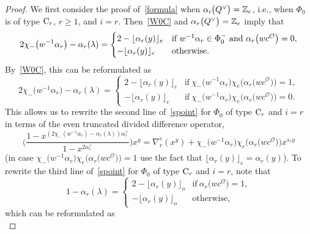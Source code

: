 \documentclass[pdftex]{sigma}
\numberwithin{equation}{section}
\begin{document}
\begin{proof}
We first consider the proof of~\eqref{formula} when $\alpha_i\smash{\bigl(Q^\vee\bigr)}=\mathbb{Z}_e$, i.e., when $\Phi_0$ is of type ${\rm C}_r$, $r\geq 1$, and $i=r$.
Then~\eqref{W0C} and $\alpha_r\smash{\bigl(Q^\vee\bigr)}=\mathbb{Z}_e$ imply that
\begin{equation*}
2\chi_-\bigl(w^{-1}\alpha_r\bigr)-\alpha_r(\lambda)=
\begin{cases}
2-\lfloor\alpha_r(y)\rfloor_e &\hbox{if }  w^{-1}\alpha_r\in\Phi_0^-\ \text{and}\ \alpha_r\bigl(wc^\mathcal{O}\bigr)=0,\\
-\lfloor\alpha_r(y)\rfloor_e &\textup{otherwise}.
\end{cases}
\end{equation*}
By~\eqref{W0C},
this can be reformulated as
\begin{equation*}%
2\chi_-\bigl(w^{-1}\alpha_r\bigr)-\alpha_r(\lambda)=
\begin{cases}
2-\lfloor\alpha_r(y)\rfloor_e &\text{if}\ \chi_-\bigl(w^{-1}\alpha_r\bigr)\chi_e\bigl(\alpha_r\bigl(wc^\mathcal{O}\bigr)\bigr)=1,\\
-\lfloor\alpha_r(y)\rfloor_e &\text{if}\ \chi_-\bigl(w^{-1}\alpha_r\bigr)\chi_e\bigl(\alpha_r\bigl(wc^\mathcal{O}\bigr)\bigr)=0.
\end{cases}
\end{equation*}
This allows us to rewrite the second line of~\eqref{spoint} for $\Phi_0$ of type ${\rm C}_r$ and $i=r$ in terms of the even truncated divided difference operator,
\begin{equation}\label{claim1}
\Biggl(\frac{1-x^{(2\chi_-(w^{-1}\alpha_r)-\alpha_r(\lambda))\alpha_r^\vee}}{1-x^{2\alpha_r^\vee}}\Biggr)x^{y}=
\nabla_r^e(x^y)+
\chi_-\bigl(w^{-1}\alpha_r\bigr)\chi_e\bigl(\alpha_r\bigl(wc^\mathcal{O}\bigr)\bigr)x^{s_ry}
\end{equation}
\big(in case $\chi_-\bigl(w^{-1}\alpha_r\bigr)\chi_e\bigl(\alpha_r\bigl(wc^\mathcal{O}\bigr)\bigr)=1$ use the fact that $\lfloor\alpha_r(y)\rfloor_e=\alpha_r(y)$\big).
To rewrite the third line of~\eqref{spoint} for $\Phi_0$ of type ${\rm C}_r$ and $i=r$, note that
\begin{equation*}
1-\alpha_r(\lambda)=
\begin{cases}
2-\lfloor\alpha_r(y)\rfloor_o &\text{if}\ \alpha_r\bigl(wc^\mathcal{O}\bigr)=1,\\
-\lfloor\alpha_r(y)\rfloor_o &\text{otherwise},
\end{cases}
\end{equation*}
which can be reformulated as
\begin{equation*}%

\end{equation*}
\end{proof}
\end{document}
